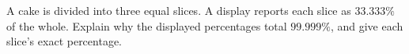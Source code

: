 A cake is divided into three equal slices. A display reports each slice as $33.333\%$ of the whole. Explain why the displayed percentages total $99.999\%$, and give each slice's exact percentage.
